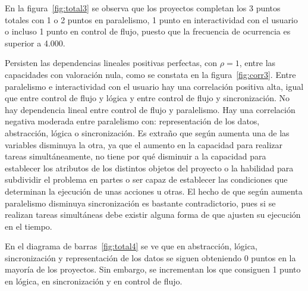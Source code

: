 \documentclass[a4paper, 12pt]{book}
\begin{document}
En la figura~\ref{fig:total3} se observa que los proyectos completan los 3 puntos totales con 1 o 2 puntos en paralelismo, 1 punto en interactividad con el usuario o incluso 1 punto en control de flujo, puesto que la frecuencia de ocurrencia es superior a 4.000.

Persisten las dependencias lineales positivas perfectas, con $\rho=1$, entre las capacidades con valoración nula, como se constata en la figura~\ref{fig:corr3}. Entre paralelismo e interactividad con el usuario hay una correlación positiva alta, igual que entre control de flujo y lógica y entre control de flujo y sincronización. No hay dependencia lineal entre control de flujo y paralelismo. Hay una correlación negativa moderada entre paralelismo con: representación de los datos, abstracción, lógica o sincronización. Es extraño que según aumenta una de las variables disminuya la otra, ya que el aumento en la capacidad para realizar tareas simultáneamente, no tiene por qué disminuir a la capacidad para establecer los atributos de los distintos objetos del proyecto o la habilidad para subdividir el problema en partes o ser capaz de establecer las condiciones que determinan la ejecución de unas acciones u otras. El hecho de que según aumenta paralelismo disminuya sincronización es bastante contradictorio, pues si se realizan tareas simultáneas debe existir alguna forma de que ajusten su ejecución en el tiempo.

En el diagrama de barras~\ref{fig:total4} se ve que en abstracción, lógica, sincronización y representación de los datos se siguen obteniendo 0 puntos en la mayoría de los proyectos. Sin embargo, se incrementan los que consiguen 1 punto en lógica, en sincronización y en control de flujo.
\end{document}
